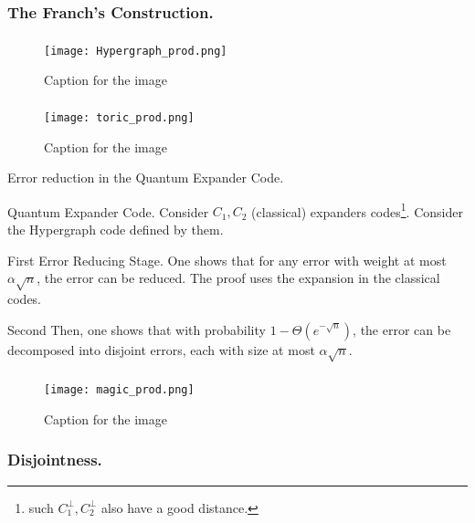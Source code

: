 \documentclass{beamer}
\begin{document}
\begin{frame}
  \frametitle{The Franch's Construction.
}

  \begin{refsection}
\cite{Tillich_2014} \cite{Leverrier_2015} \cite{grospellier:tel-03364419}
  \printbibliography
\end{refsection}

\end{frame}


\begin{frame}
  \frametitle{  }
\begin{figure}[h]
    \centering
    \texttt{[image: Hypergraph\_prod.png]}
    \caption{Caption for the image}
    \label{fig:your-label}
\end{figure}

\end{frame}

\begin{frame}
  \frametitle{  }

\begin{figure}[h]
    \centering
    \texttt{[image: toric\_prod.png]}
    \caption{Caption for the image}
    \label{fig:your-label}
\end{figure}

\end{frame}

\begin{frame}{Error reduction in the Quantum Expander Code.}

  \begin{block}{Quantum Expander Code.}
    Consider $C_{1},C_{2}$ (classical) expanders codes\footnote{such $C_{1}^{\perp}, C_{2}^{\perp}$ also have a good distance.}. Consider the Hypergraph code defined by them.
  \end{block}


  \begin{block}{First}
  Error  Reducing Stage. One shows that for any error with weight at most $\alpha \sqrt{n}$, the error can be reduced. The proof uses the expansion in the classical codes.
\end{block}

\begin{block}{Second}
  Then, one shows that with probability $1 - \Theta(e^{-\sqrt{n}})$, the error can be decomposed into disjoint errors, each with size at most $\alpha \sqrt{n}$.
  \end{block} 


\end{frame}



\begin{frame}
  \frametitle{ } 
\begin{figure}[h]
    \centering
    \texttt{[image: magic\_prod.png]}
    \caption{Caption for the image}
    \label{fig:your-label}
\end{figure}
\end{frame}



\begin{frame}
  \frametitle{Disjointness.}
\end{frame}
\end{document}
